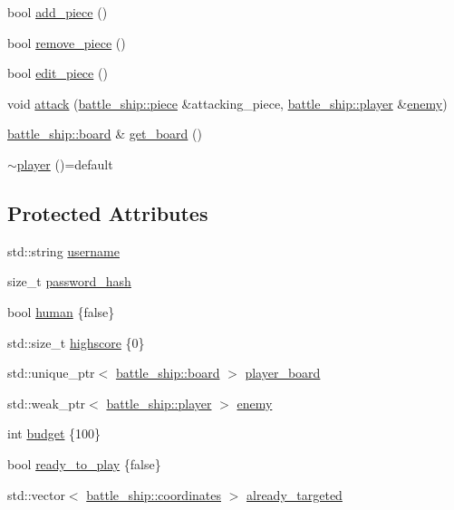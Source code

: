 \begin{DoxyCompactItemize}
bool \hyperlink{classbattle__ship_1_1player_a704897da96d9e2d956bb75fc73c84508}{add\+\_\+piece} ()
\item 
bool \hyperlink{classbattle__ship_1_1player_a9ccc70a9f00546f42a4bc7332ba0cfd4}{remove\+\_\+piece} ()
\item 
bool \hyperlink{classbattle__ship_1_1player_af7524f337fabec20fe8f0ae3288cf9bb}{edit\+\_\+piece} ()
\item 
void \hyperlink{classbattle__ship_1_1player_aefb7ecb4869022d06472b9a9f961020c}{attack} (\hyperlink{classbattle__ship_1_1piece}{battle\+\_\+ship\+::piece} \&attacking\+\_\+piece, \hyperlink{classbattle__ship_1_1player}{battle\+\_\+ship\+::player} \&\hyperlink{classbattle__ship_1_1player_aa2ebaf963d19dc6b72157e64119e2751}{enemy})
\item 
\hyperlink{classbattle__ship_1_1board}{battle\+\_\+ship\+::board} \& \hyperlink{classbattle__ship_1_1player_a8b896d17e51345a138ba997903b347f1}{get\+\_\+board} ()
\item 
\hyperlink{classbattle__ship_1_1player_afbb6b6e880864bf7a36f21a95665a6c7}{$\sim$player} ()=default
\end{DoxyCompactItemize}
\subsection*{Protected Attributes}
\begin{DoxyCompactItemize}
\item 
std\+::string \hyperlink{classbattle__ship_1_1player_aed786567891bcafecb8610e12fb5d413}{username}
\item 
size\+\_\+t \hyperlink{classbattle__ship_1_1player_ae8c566b4c37fda79fcc712088f7adf2b}{password\+\_\+hash}
\item 
bool \hyperlink{classbattle__ship_1_1player_a890870a47a67c3be92b1807b861ec1b7}{human} \{false\}
\item 
std\+::size\+\_\+t \hyperlink{classbattle__ship_1_1player_aa005c81fe9bd05f05cd54be0207b8c40}{highscore} \{0\}
\item 
std\+::unique\+\_\+ptr$<$ \hyperlink{classbattle__ship_1_1board}{battle\+\_\+ship\+::board} $>$ \hyperlink{classbattle__ship_1_1player_a13008c5d6e7464b312c04ac00e18c2fb}{player\+\_\+board}
\item 
std\+::weak\+\_\+ptr$<$ \hyperlink{classbattle__ship_1_1player}{battle\+\_\+ship\+::player} $>$ \hyperlink{classbattle__ship_1_1player_aa2ebaf963d19dc6b72157e64119e2751}{enemy}
\item 
int \hyperlink{classbattle__ship_1_1player_a01f047aac5fcca92ff1e42d4d1e398c9}{budget} \{100\}
\item 
bool \hyperlink{classbattle__ship_1_1player_a48a3f8c692c7ea1def384c39b9b65e85}{ready\+\_\+to\+\_\+play} \{false\}
\item 
std\+::vector$<$ \hyperlink{structbattle__ship_1_1coordinates}{battle\+\_\+ship\+::coordinates} $>$ \hyperlink{classbattle__ship_1_1player_a63d66b930a6048dac566f79a644c2d7a}{already\+\_\+targeted}
\end{DoxyCompactItemize}


